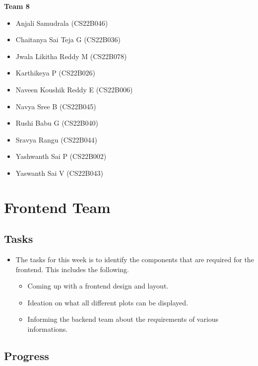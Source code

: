 \documentclass[12pt]{article}
\begin{document}
\begin{center}
    \noindent \textbf{Team 8}
    \begin{multicols}{2}
        \begin{itemize}
            \item Anjali Samudrala (CS22B046)
            \item Chaitanya Sai Teja G (CS22B036)
            \item Jwala Likitha Reddy M (CS22B078)
            \item Karthikeya P (CS22B026)
            \item Naveen Koushik Reddy E (CS22B006)
            \item Navya Sree B (CS22B045)
            \item Rushi Babu G (CS22B040)
            \item Sravya Rangu (CS22B044)
            \item Yashwanth Sai P (CS22B002)
            \item Yaswanth Sai V (CS22B043)
        \end{itemize}
    \end{multicols}
    \vspace{0.5cm}

\end{center}
\clearpage

\section{Frontend Team}
\subsection{Tasks}
\begin{itemize}
    \item The tasks for this week is to identify the components that are required for the frontend. This includes the following.
    \begin{itemize}
        \item Coming up with a frontend design and layout.
        \item Ideation on what all different plots can be displayed.
        \item Informing the backend team about the requirements of various informations.
    \end{itemize}
\end{itemize}

\subsection{Progress}
\end{document}
